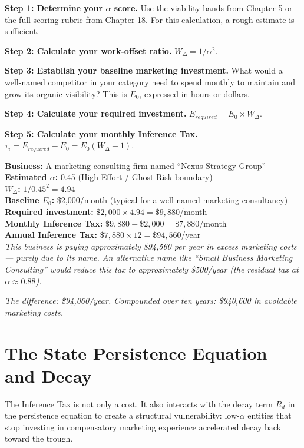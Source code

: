 \documentclass[12pt, openany]{book}
\theoremstyle{thmstyle}
\theoremstyle{defstyle}
\newcommand{\taui}{\tau_i}
\newcommand{\Wdelta}{W_{\Delta}}
\begin{document}
\textbf{Step 1: Determine your $\alpha$ score.} Use the viability bands from Chapter 5 or the full scoring rubric from Chapter 18. For this calculation, a rough estimate is sufficient.

\textbf{Step 2: Calculate your work-offset ratio.} $\Wdelta = 1/\alpha^2$.

\textbf{Step 3: Establish your baseline marketing investment.} What would a well-named competitor in your category need to spend monthly to maintain and grow its organic visibility? This is $E_0$, expressed in hours or dollars.

\textbf{Step 4: Calculate your required investment.} $E_{required} = E_0 \times \Wdelta$.

\textbf{Step 5: Calculate your monthly Inference Tax.} $\taui = E_{required} - E_0 = E_0(\Wdelta - 1)$.

\begin{calcbox}
\textbf{Business:} A marketing consulting firm named ``Nexus Strategy Group''\\
\textbf{Estimated $\alpha$:} 0.45 (High Effort / Ghost Risk boundary)\\
\textbf{$\Wdelta$:} $1/0.45^2 = 4.94$\\
\textbf{Baseline $E_0$:} \$2,000/month (typical for a well-named marketing consultancy)\\
\textbf{Required investment:} $\$2,000 \times 4.94 = \$9,880$/month\\
\textbf{Monthly Inference Tax:} $\$9,880 - \$2,000 = \$7,880$/month\\
\textbf{Annual Inference Tax:} $\$7,880 \times 12 = \$94,560$/year\\

\textit{This business is paying approximately \$94,560 per year in excess marketing costs --- purely due to its name. An alternative name like ``Small Business Marketing Consulting'' would reduce this tax to approximately \$500/year (the residual tax at $\alpha \approx 0.88$).}

\textit{The difference: \$94,060/year. Compounded over ten years: \$940,600 in avoidable marketing costs.}
\end{calcbox}

\section{The State Persistence Equation and Decay}

The Inference Tax is not only a cost. It also interacts with the decay term $R_d$ in the persistence equation to create a structural vulnerability: low-$\alpha$ entities that stop investing in compensatory marketing experience accelerated decay back toward the trough.
\end{document}
